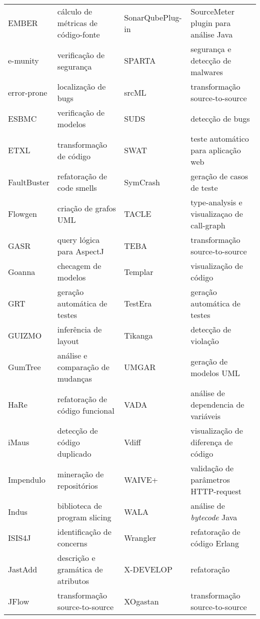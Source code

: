 \begin{table}[h]
{\begin{tabular}{| l | l | l | l |}
  EMBER          & cálculo de métricas de código-fonte  & SonarQubePlug-in & SourceMeter plugin para análise Java \\
  e-munity       & verificação de segurança             & SPARTA           & segurança e detecção de malwares     \\
  error-prone    & localização de bugs                  & srcML            & transformação source-to-source       \\
  ESBMC          & verificação de modelos               & SUDS             & detecção de bugs                     \\
  ETXL           & transformação de código              & SWAT             & teste automático para aplicação web  \\
  FaultBuster    & refatoração de code smells           & SymCrash         & geração de casos de teste            \\
  Flowgen        & criação de grafos UML                & TACLE            & type-analysis e visualizaçao de call-graph \\
  GASR           & query lógica para AspectJ            & TEBA             & transformação source-to-source       \\
  Goanna         & checagem de modelos                  & Templar          & visualização de código               \\
  GRT            & geração automática de testes         & TestEra          & geração automática de testes         \\
  GUIZMO         & inferência de layout                 & Tikanga          & detecção de violação                 \\
  GumTree        & análise e comparação de mudanças     & UMGAR            & geração de modelos UML               \\
  HaRe           & refatoração de código funcional      & VADA             & análise de dependencia de variáveis  \\
  iMaus          & detecção de código duplicado         & Vdiff            & visualização de diferença de código  \\
  Impendulo      & mineração de repositórios            & WAIVE+           & validação de parâmetros HTTP-request \\
  Indus          & biblioteca de program slicing        & WALA             & análise de {\it bytecode} Java       \\
  ISIS4J         & identificação de concerns            & Wrangler         & refatoração de código Erlang         \\
  JastAdd        & descrição e gramática de atributos   & X-DEVELOP        & refatoração                          \\
  JFlow          & transformação source-to-source       & XOgastan         & transformação source-to-source       \\
  \hline
\end{tabular}
\label{resumo-softwares}
}
\end{table}
